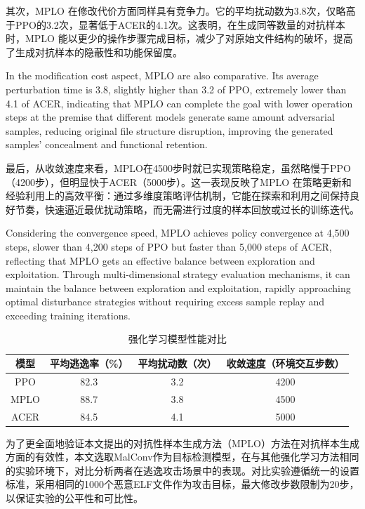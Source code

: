 其次，MPLO 在修改代价方面同样具有竞争力。它的平均扰动数为3.8次，仅略高于PPO的3.2次，显著低于ACER的4.1次。这表明，在生成同等数量的对抗样本时，MPLO 能以更少的操作步骤完成目标，减少了对原始文件结构的破坏，提高了生成对抗样本的隐蔽性和功能保留度。

In the modification cost aspect, MPLO are also comparative. Its average perturbation time is 3.8, slightly higher than 3.2 of PPO, extremely lower than 4.1 of ACER, indicating that MPLO can complete the goal with lower operation steps at the premise that different models generate same amount adversarial samples, reducing original file structure disruption, improving the generated samples' concealment and functional retention.

最后，从收敛速度来看，MPLO在4500步时就已实现策略稳定，虽然略慢于PPO（4200步），但明显快于ACER（5000步）。这一表现反映了MPLO 在策略更新和经验利用上的高效平衡：通过多维度策略评估机制，它能在探索和利用之间保持良好节奏，快速逼近最优扰动策略，而无需进行过度的样本回放或过长的训练迭代。

Considering the convergence speed, MPLO achieves policy convergence at 4,500 steps, slower than 4,200 steps of PPO but faster than 5,000 steps of ACER, reflecting that MPLO gets an effective balance between exploration and exploitation. Through multi-dimensional strategy evaluation mechanisms, it can maintain the balance between exploration and exploitation, rapidly approaching optimal disturbance strategies without requiring excess sample replay and exceeding training iterations.

\begin{table}[htbp]
	\centering
	\caption{强化学习模型性能对比}
	\label{tab:5.9}
	\begin{tabular*}{0.9\textwidth}{@{\extracolsep{\fill}}cccc}
		\toprule
		模型 & 平均逃逸率（\%） & 平均扰动数（次） & 收敛速度（环境交互步数） \\
		\midrule
		PPO & 82.3 & 3.2 & 4200 \\
		MPLO & 88.7 & 3.8 & 4500 \\
		ACER & 84.5 & 4.1 & 5000 \\
		\bottomrule
	\end{tabular*}
\end{table}

为了更全面地验证本文提出的对抗性样本生成方法（MPLO）方法在对抗样本生成方面的有效性，本文选取MalConv\cite{raff2017malware}作为目标检测模型，在与其他强化学习方法相同的实验环境下，对比分析两者在逃逸攻击场景中的表现。对比实验遵循统一的设置标准，采用相同的1000个恶意ELF文件作为攻击目标，最大修改步数限制为20步，以保证实验的公平性和可比性。

